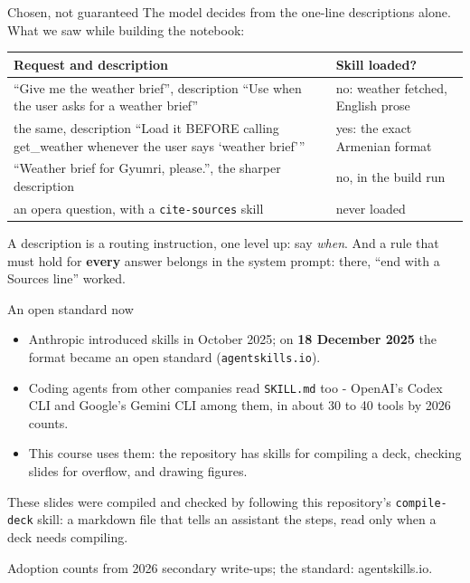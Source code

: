 \documentclass[aspectratio=169]{beamer}
\newcommand{\trapbox}[1]{%
  \begin{tcolorbox}[colback=armred!8, colframe=armred, boxrule=0.6pt, arc=2pt]
  #1
  \end{tcolorbox}}
\newcommand{\takebox}[1]{%
  \begin{tcolorbox}[colback=paramgreen!8, colframe=paramgreen, boxrule=0.6pt, arc=2pt]
  #1
  \end{tcolorbox}}
\newcommand{\src}[1]{{\scriptsize\color{gray} #1}}
\begin{document}
\begin{frame}{Chosen, not guaranteed}
  \vspace{0.3em}
  {\small The model decides from the one-line descriptions alone. What we saw while building the notebook:}

  \vspace{0.3em}
  \begin{center}
  \footnotesize
  \begin{tabular}{>{\raggedright\arraybackslash}p{}>{\raggedright\arraybackslash}p{}}
    \toprule
    \textbf{Request and description} & \textbf{Skill loaded?} \\
    \midrule
    ``Give me the weather brief'', description ``Use when the user asks for a weather brief'' & no: weather fetched,
      English prose \\
    the same, description ``Load it BEFORE calling get\_weather whenever the user says `weather brief''' & yes:
      the exact Armenian format \\
    ``Weather brief for Gyumri, please.'', the sharper description & no, in the build run \\
    an opera question, with a \texttt{cite-sources} skill & never loaded \\
    \bottomrule
  \end{tabular}
  \end{center}

  \vspace{0.3em}
  \trapbox{\small A description is a routing instruction, one level up: say \emph{when}. And a rule that must
  hold for \textbf{every} answer belongs in the system prompt: there, ``end with a Sources line'' worked.}
\end{frame}

\begin{frame}{An open standard now}
  \vspace{0.4em}
  \begin{itemize}
    \item Anthropic introduced skills in October 2025; on \textbf{18 December 2025} the format became an open
      standard (\texttt{agentskills.io}).
    \item Coding agents from other companies read \texttt{SKILL.md} too - OpenAI's Codex CLI and Google's Gemini
      CLI among them, in about 30 to 40 tools by 2026 counts.
    \item This course uses them: the repository has skills for compiling a deck, checking slides for overflow,
      and drawing figures.
  \end{itemize}

  \vspace{0.5em}
  \takebox{These slides were compiled and checked by following this repository's \texttt{compile-deck} skill: a
  markdown file that tells an assistant the steps, read only when a deck needs compiling.}

  \vspace{0.2em}
  \src{Adoption counts from 2026 secondary write-ups; the standard: agentskills.io.}
\end{frame}
\end{document}
